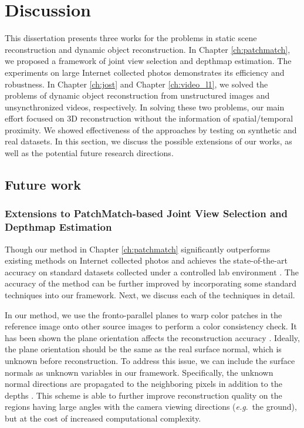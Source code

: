 \chapter{Discussion}
\label{ch:discussion}
This dissertation presents three works for the problems in static scene reconstruction and dynamic object reconstruction. In Chapter \ref{ch:patchmatch}, we proposed a framework of joint view selection and depthmap estimation. The experiments on large Internet collected photos demonstrates its efficiency and robustness. In Chapter \ref{ch:jost} and Chapter \ref{ch:video_l1}, we solved the problems of dynamic object reconstruction from unstructured images and unsyncthronized videos, respectively. In solving these two problems, our main effort focused on 3D reconstruction without the information of spatial/temporal proximity. We showed effectiveness of the approaches by testing on synthetic and real datasets. In this section, we discuss the possible extensions of our works, as well as the potential future research directions.

\section{Future work}

\subsection{Extensions to PatchMatch-based Joint View Selection and Depthmap Estimation}
\label{sec:patchmatch_extensions}

Though our method in Chapter \ref{ch:patchmatch} significantly outperforms existing methods on Internet collected photos \cite{Goesele07} and achieves the state-of-the-art accuracy on standard datasets collected under a controlled lab environment \cite{Strecha08}. The accuracy of the method can be further improved by incorporating some standard techniques into our framework. Next, we discuss each of the techniques in detail.

In our method, we use the fronto-parallel planes to warp color patches in the reference image onto other source images to perform a color consistency check. It has been shown the plane orientation affects the reconstruction accuracy \cite{Gallup07,FURUKAWA_PAMI2010}. Ideally, the plane orientation should be the same as the real surface normal, which is unknown before reconstruction. To address this issue, we can include the surface normals as unknown variables in our framework. Specifically, the unknown normal directions are propagated to the neighboring pixels in addition to the depths \cite{patchMatchStereo1}. This scheme is able to further improve reconstruction quality on the regions having large angles with the camera viewing directions (\emph{e.g}.~the ground), but at the cost of increased computational complexity.


